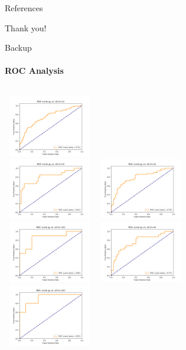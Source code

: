 \documentclass[
	english,%
	aspectratio=169,%
	color={accentcolor=3b},
	logo=true,%
	colorframetitle=false,%
	]{tudabeamer}
\begin{document}
\begin{frame}{References}
\vspace{-5pt}
\small


\end{frame}


\begin{frame}[c]{}
\centering \Huge
Thank you!
\end{frame}


\begin{frame}{Backup}
\framesubtitle{ROC Analysis}
\begin{columns}[t]
	\centering
	\includegraphics[width=4cm,height=2.7cm]{figures/AUROC_100samples_class0_llh_n1}\\
	\includegraphics[width=4cm,height=2.7cm]{figures/AUROC_100samples_class0_llh_n5}
	\centering
	\includegraphics[width=4cm,height=2.7cm]{figures/AUROC_100samples_class0_llh_n2}\\
	\includegraphics[width=4cm,height=2.7cm]{figures/AUROC_100samples_class0_llh_n10}
	\centering
	\includegraphics[width=4cm,height=2.7cm]{figures/AUROC_100samples_class0_llh_n4}\\
	\includegraphics[width=4cm,height=2.7cm]{figures/AUROC_100samples_class0_llh_n20}
\end{columns}
\end{frame}
\end{document}
